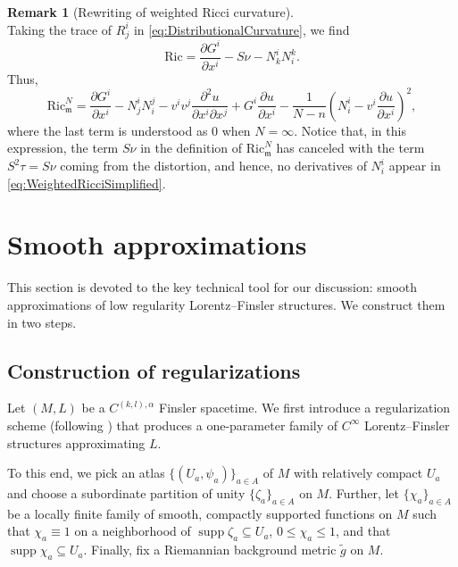 \documentclass[a4paper,11pt]{article}
\numberwithin{equation}{section}
\theoremstyle{definition}
\newtheorem{Remark}[Definition]{Remark}
\theoremstyle{plain}
\newcommand{\Ric}{\mathrm{Ric}}
\newcommand{\m}{\mathfrak m}
\DeclareMathOperator{\supp}{supp}
\begin{document}
\begin{Remark}[Rewriting of weighted Ricci curvature]
\begin{equation*}
    \end{equation*}
    Taking the trace of $R^i_j$ in \eqref{eq:DistributionalCurvature}, we find
    \begin{equation*}
        \Ric = \frac{\partial G^i}{\partial x^i} - S \nu - N^i_k N^k_i.
    \end{equation*}
    Thus,
    \begin{equation}
    \label{eq:WeightedRicciSimplified}
        \Ric_{\m}^N =\frac{\partial G^i}{\partial x^i} - N^i_j N^j_i- v^iv^j\frac{\partial^2 u}{\partial x^i\partial x^j} +G^i\frac{\partial u}{\partial x^i} -\frac{1}{N-n}\left(N^i_i-v^i\frac{\partial u}{\partial x^i}\right)^2,
    \end{equation}
    where the last term is understood as $0$ when $N=\infty$.
    Notice that, in this expression, the term $S\nu$ in the definition of $\Ric_{\m}^N$ has canceled with the term $S^2\tau = S \nu$ coming from the distortion, and hence, no derivatives of $N^i_i$ appear in \eqref{eq:WeightedRicciSimplified}.
    \end{Remark}


\section{Smooth approximations}%
\label{subsection: Regularization, Legendre transform}

This section is devoted to the key technical tool for our discussion: smooth approximations of low regularity Lorentz--Finsler structures.
We construct them in two steps.


\subsection{Construction of regularizations}\label{ssc:L_e}


Let $(M,L)$ be a $C^{(k,l),\alpha}$ Finsler spacetime.
We first introduce a regularization scheme (following \cite{Graf-SingularityC1,KOSS}) that produces a one-parameter family of $C^\infty$ Lorentz--Finsler structures approximating $L$.

To this end, we pick an atlas $\{(U_a,  \psi_a)\}_{a \in A}$ of $M$ with relatively compact $U_a$ and choose a subordinate partition of unity $\{\zeta_a\}_{a \in A}$ on $M$.
Further, let $\{{\chi}_{a}\}_{a \in A}$ be a locally finite family of smooth, compactly supported functions on $M$ such that $\chi_a \equiv 1$ on a neighborhood of $\supp \zeta_a \subseteq U_a$, $0 \leq \chi_a \leq 1$, and that $\supp \chi_a \subseteq U_a$.
Finally, fix a Riemannian background metric $\tilde g$ on $M$.
\end{document}
